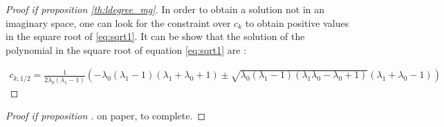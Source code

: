 \begin{proof}[Proof if proposition \ref{th:ldegree_mg}]
In order to obtain a solution not in an imaginary space, one can look for the constraint over
$c_k$ to obtain positive values in the square root of \eqref{eq:sqrt1}. It can be show
that the solution of the polynomial in the square root of equation \eqref{eq:sqrt1} are : 

\begin{align}
    c_{k,1/2} = \frac{1}{2 \lambda_0 \left(\lambda_1 - 1\right)} \left(- \lambda_0 \left(\lambda_1 - 1\right) \left(\lambda_1
    + \lambda_0 + 1\right) \pm \sqrt{\lambda_0 \left(\lambda_1 - 1\right) \left(\lambda_1 \lambda_0 - \lambda_0 + 1\right)} \left(\lambda_1 + \lambda_0 - 1\right)\right) 
\end{align}

\end{proof}


\begin{proof}[Proof if proposition \label{th:feature_mg}]
on paper, to complete.
\end{proof}

